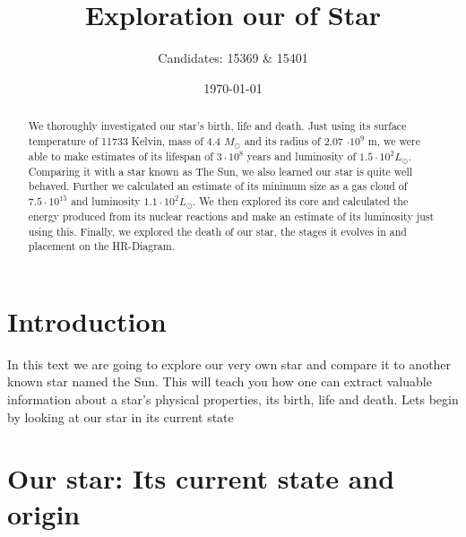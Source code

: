 \documentclass[reprint,english,notitlepage]{revtex4-2}
\begin{document}
\title{Exploration our of Star}
\author{Candidates: 15369 \& 15401}
\date{\today}

\begin{abstract}
    We thoroughly investigated our star's birth, life and death. Just using its surface temperature of 11733 Kelvin, mass of 4.4 $ M_{⊙} $ and its radius of 2.07 $ ⋅ 10^{9} $ m, we were able to make estimates of its lifespan of $ 3 ⋅ 10^{8} $ years and luminosity of $ 1.5 ⋅ 10^{2} L_{⊙}$. Comparing it with a star known as The Sun, we also learned our star is quite well behaved. Further we calculated an estimate of its minimum size as a gas cloud of $ 7.5 ⋅ 10^{15} $ and luminosity $ 1.1 ⋅ 10^{2} L_{⊙}$. We then explored its core and calculated the energy produced from its nuclear reactions and make an estimate of its luminosity just using this. Finally, we explored the death of our star, the stages it evolves in and placement on the HR-Diagram.
\end{abstract}
\maketitle
\section{Introduction} \label{sec: introduction}
In this text we are going to explore our very own star and compare it to another known star named the Sun. This will teach you how one can extract valuable information about a star's physical properties, its birth, life and death. Lets begin by looking at our star in its current state      

\section{Our star: Its current state and origin}
\end{document}

